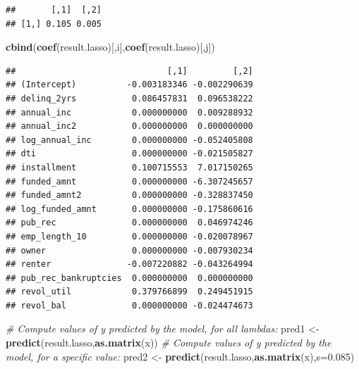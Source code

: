 \documentclass[
  12pt,
]{book}
\newenvironment{Shaded}{\begin{snugshade}}{\end{snugshade}}
\newcommand{\AttributeTok}[1]{\textcolor[rgb]{0.13,0.29,0.53}{#1}}
\newcommand{\CommentTok}[1]{\textcolor[rgb]{0.56,0.35,0.01}{\textit{#1}}}
\newcommand{\DecValTok}[1]{\textcolor[rgb]{0.00,0.00,0.81}{#1}}
\newcommand{\FloatTok}[1]{\textcolor[rgb]{0.00,0.00,0.81}{#1}}
\newcommand{\FunctionTok}[1]{\textcolor[rgb]{0.13,0.29,0.53}{\textbf{#1}}}
\newcommand{\NormalTok}[1]{#1}
\newcommand{\OtherTok}[1]{\textcolor[rgb]{0.56,0.35,0.01}{#1}}
\newcommand{\SpecialCharTok}[1]{\textcolor[rgb]{0.81,0.36,0.00}{\textbf{#1}}}
\theoremstyle{definition}
\theoremstyle{definition}
\theoremstyle{definition}
\theoremstyle{definition}
\theoremstyle{remark}
\begin{document}
\begin{Shaded}
\end{Shaded}

\begin{verbatim}
##       [,1]  [,2]
## [1,] 0.105 0.005
\end{verbatim}

\begin{Shaded}
\begin{Highlighting}[]
\FunctionTok{cbind}\NormalTok{(}\FunctionTok{coef}\NormalTok{(result.lasso)[,i],}\FunctionTok{coef}\NormalTok{(result.lasso)[,j])}
\end{Highlighting}
\end{Shaded}

\begin{verbatim}
##                              [,1]         [,2]
## (Intercept)          -0.003183346 -0.002290639
## delinq_2yrs           0.086457831  0.096538222
## annual_inc            0.000000000  0.009288932
## annual_inc2           0.000000000  0.000000000
## log_annual_inc        0.000000000 -0.052405808
## dti                   0.000000000 -0.021505827
## installment           0.100715553  7.017150265
## funded_amnt           0.000000000 -6.307245657
## funded_amnt2          0.000000000 -0.328837450
## log_funded_amnt       0.000000000 -0.175860616
## pub_rec               0.000000000  0.046974246
## emp_length_10         0.000000000 -0.020078967
## owner                 0.000000000 -0.007930234
## renter               -0.007220882 -0.043264994
## pub_rec_bankruptcies  0.000000000  0.000000000
## revol_util            0.379766899  0.249451915
## revol_bal             0.000000000 -0.024474673
\end{verbatim}

\begin{Shaded}
\begin{Highlighting}[]
\CommentTok{\# Compute values of y predicted by the model, for all lambdas:}
\NormalTok{pred1 }\OtherTok{\textless{}{-}} \FunctionTok{predict}\NormalTok{(result.lasso,}\FunctionTok{as.matrix}\NormalTok{(x))}
\CommentTok{\# Compute values of y predicted by the model, for a specific value:}
\NormalTok{pred2 }\OtherTok{\textless{}{-}} \FunctionTok{predict}\NormalTok{(result.lasso,}\FunctionTok{as.matrix}\NormalTok{(x),}\AttributeTok{s=}\FloatTok{0.085}\NormalTok{)}
\end{Highlighting}
\end{Shaded}
\end{document}
